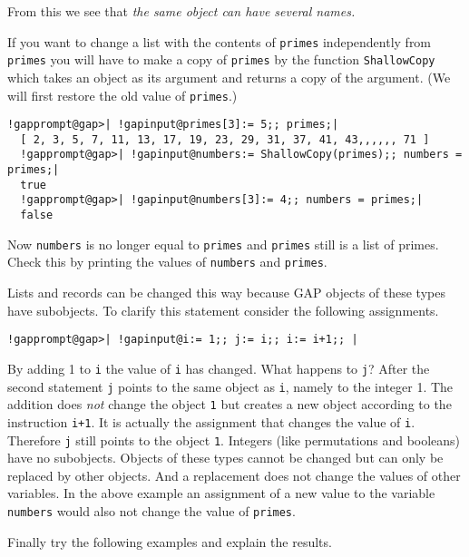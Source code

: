 \documentclass[a4paper,11pt]{report}
\begin{document}
{{ From this we see that \emph{the same object can have several names.} 

 If you want to change a list with the contents of \texttt{primes} independently from \texttt{primes} you will have to make a copy of \texttt{primes} by the function \texttt{ShallowCopy} which takes an object as its argument and returns a copy of the argument. (We
will first restore the old value of \texttt{primes}.) 

 
\begin{Verbatim}[commandchars=!@|,fontsize=\small,frame=single,label=Example]
  !gapprompt@gap>| !gapinput@primes[3]:= 5;; primes;|
  [ 2, 3, 5, 7, 11, 13, 17, 19, 23, 29, 31, 37, 41, 43,,,,,, 71 ]
  !gapprompt@gap>| !gapinput@numbers:= ShallowCopy(primes);; numbers = primes;|
  true
  !gapprompt@gap>| !gapinput@numbers[3]:= 4;; numbers = primes;|
  false
\end{Verbatim}
 

 Now \texttt{numbers} is no longer equal to \texttt{primes} and \texttt{primes} still is a list of primes. Check this by printing the values of \texttt{numbers} and \texttt{primes}. 

 Lists and records can be changed this way because \textsf{GAP} objects of these types have subobjects. To clarify this statement consider the
following assignments. 

 
\begin{Verbatim}[commandchars=!@|,fontsize=\small,frame=single,label=Example]
  !gapprompt@gap>| !gapinput@i:= 1;; j:= i;; i:= i+1;; |
\end{Verbatim}
 

 By adding 1 to \texttt{i} the value of \texttt{i} has changed. What happens to \texttt{j}? After the second statement \texttt{j} points to the same object as \texttt{i}, namely to the integer 1. The addition does \emph{not} change the object \texttt{1} but creates a new object according to the instruction \texttt{i+1}. It is actually the assignment that changes the value of \texttt{i}. Therefore \texttt{j} still points to the object \texttt{1}. Integers (like permutations and booleans) have no subobjects. Objects of
these types cannot be changed but can only be replaced by other objects. And a
replacement does not change the values of other variables. In the above
example an assignment of a new value to the variable \texttt{numbers} would also not change the value of \texttt{primes}. 

 Finally try the following examples and explain the results. 

}}
\end{document}
